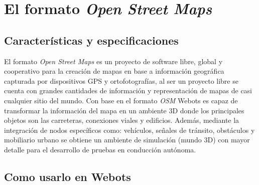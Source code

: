 
\section{El formato \textit{Open Street Maps}} \label{sec:el_formato_open_street_maps}

\subsection{Características y especificaciones}

El formato \textit{Open Street Maps} es un proyecto de software libre, global y cooperativo para la creación de mapas en base a información geográfica capturada por dispositivos GPS y ortofotografías, al ser un proyecto libre se cuenta con grandes cantidades de información y representación de mapas de casi cualquier sitio del mundo. Con base en el formato \textit{OSM} Webots es capaz de transformar la información del mapa en un ambiente 3D donde los principales objetos son las carreteras, conexiones viales y edificios. Además, mediante la integración de nodos específicos como: vehículos, señales de tránsito, obstáculos y mobiliario urbano se obtiene un ambiente de simulación (mundo 3D) con mayor detalle para el desarrollo de pruebas en conducción autónoma.

\subsection{Como usarlo en Webots}

